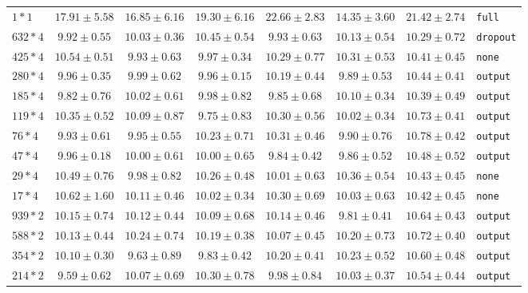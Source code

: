 \documentclass[conference]{IEEEtran}
\begin{document}
\begin{longtable}{@{}lccccccl@{}}
$1*1$ & $17.91 \pm 5.58$ & $16.85 \pm 6.16$ & $19.30 \pm 6.16$ & \bfseries $22.66 \pm 2.83$ & $14.35 \pm 3.60$ & $21.42 \pm 2.74$ & \texttt{full} \\
$632*4$ & $9.92 \pm 0.55$ & $10.03 \pm 0.36$ & \bfseries $10.45 \pm 0.54$ & $9.93 \pm 0.63$ & $10.13 \pm 0.54$ & $10.29 \pm 0.72$ & \texttt{dropout} \\
$425*4$ & \bfseries $10.54 \pm 0.51$ & $9.93 \pm 0.63$ & $9.97 \pm 0.34$ & $10.29 \pm 0.77$ & $10.31 \pm 0.53$ & $10.41 \pm 0.45$ & \texttt{none} \\
$280*4$ & $9.96 \pm 0.35$ & $9.99 \pm 0.62$ & $9.96 \pm 0.15$ & $10.19 \pm 0.44$ & $9.89 \pm 0.53$ & \bfseries $10.44 \pm 0.41$ & \texttt{output} \\
$185*4$ & $9.82 \pm 0.76$ & $10.02 \pm 0.61$ & $9.98 \pm 0.82$ & $9.85 \pm 0.68$ & $10.10 \pm 0.34$ & \bfseries $10.39 \pm 0.49$ & \texttt{output} \\
$119*4$ & $10.35 \pm 0.52$ & $10.09 \pm 0.87$ & $9.75 \pm 0.83$ & $10.30 \pm 0.56$ & $10.02 \pm 0.34$ & \bfseries $10.73 \pm 0.41$ & \texttt{output} \\
$76*4$ & $9.93 \pm 0.61$ & $9.95 \pm 0.55$ & $10.23 \pm 0.71$ & $10.31 \pm 0.46$ & $9.90 \pm 0.76$ & \bfseries $10.78 \pm 0.42$ & \texttt{output} \\
$47*4$ & $9.96 \pm 0.18$ & $10.00 \pm 0.61$ & $10.00 \pm 0.65$ & $9.84 \pm 0.42$ & $9.86 \pm 0.52$ & \bfseries $10.48 \pm 0.52$ & \texttt{output} \\
$29*4$ & \bfseries $10.49 \pm 0.76$ & $9.98 \pm 0.82$ & $10.26 \pm 0.48$ & $10.01 \pm 0.63$ & $10.36 \pm 0.54$ & $10.43 \pm 0.45$ & \texttt{none} \\
$17*4$ & \bfseries $10.62 \pm 1.60$ & $10.11 \pm 0.46$ & $10.02 \pm 0.34$ & $10.30 \pm 0.69$ & $10.03 \pm 0.63$ & $10.42 \pm 0.45$ & \texttt{none} \\
$939*2$ & $10.15 \pm 0.74$ & $10.12 \pm 0.44$ & $10.09 \pm 0.68$ & $10.14 \pm 0.46$ & $9.81 \pm 0.41$ & \bfseries $10.64 \pm 0.43$ & \texttt{output} \\
$588*2$ & $10.13 \pm 0.44$ & $10.24 \pm 0.74$ & $10.19 \pm 0.38$ & $10.07 \pm 0.45$ & $10.20 \pm 0.73$ & \bfseries $10.72 \pm 0.40$ & \texttt{output} \\
$354*2$ & $10.10 \pm 0.30$ & $9.63 \pm 0.89$ & $9.83 \pm 0.42$ & $10.20 \pm 0.41$ & $10.23 \pm 0.52$ & \bfseries $10.60 \pm 0.48$ & \texttt{output} \\
$214*2$ & $9.59 \pm 0.62$ & $10.07 \pm 0.69$ & $10.30 \pm 0.78$ & $9.98 \pm 0.84$ & $10.03 \pm 0.37$ & \bfseries $10.54 \pm 0.44$ & \texttt{output} \\

\end{longtable}
\end{document}

